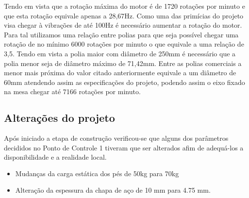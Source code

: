     Tendo em vista que a rotação máxima do motor é de 1720 rotações por minuto e que esta rotação equivale apenas a 28,67Hz. Como uma das primícias do projeto visa chegar à vibrações de até 100Hz é necessário aumentar a rotação do motor. Para tal utilizamos uma relação entre polias para que seja possível chegar uma rotação de no mínimo 6000 rotações por minuto o que equivale a uma relação de 3,5. Tendo em vista a polia maior com diâmetro de 250mm é necessário que a polia menor seja de diâmetro máximo de 71,42mm. Entre as polias comerciais a menor mais próxima do valor citado anteriormente equivale a um diâmetro de 60mm atendendo assim as especificações do projeto, podendo assim o eixo fixado na mesa chegar até 7166 rotações por minuto.

\subsection*{Alterações do projeto}

Após iniciado a etapa de construção verificou-se que alguns dos parâmetros decididos no Ponto de Controle 1 tiveram que ser alterados afim de adequá-los a disponibilidade  e a realidade local.
\begin{itemize}
\item Mudanças da carga estática dos pés de 50kg  para 70kg
\item Alteração da espessura da chapa de aço de 10 mm para 4.75 mm.

\end{itemize}